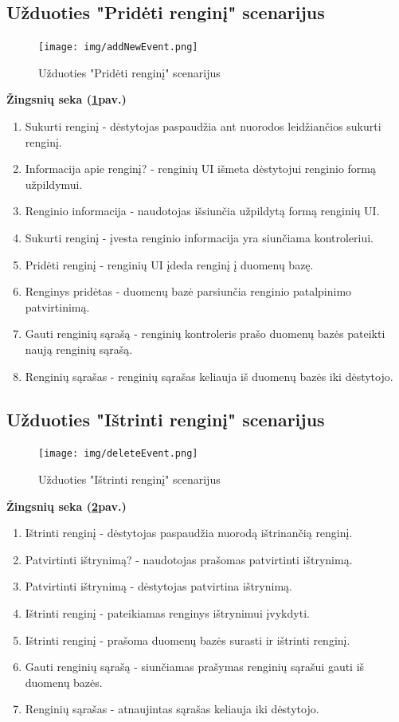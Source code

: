 \documentclass{VUMIFPSkursinis}
\begin{document}
\subsection{Užduoties "Pridėti renginį" scenarijus}
\begin{figure}[H]
	\centering
	\texttt{[image: img/addNewEvent.png]}
	\caption{Užduoties "Pridėti renginį" scenarijus}
	\label{fig:addNewEvent}
\end{figure}
\textbf{Žingsnių seka (\ref{fig:addNewEvent}pav.)}\\
\begin{enumerate}
	\item Sukurti renginį - dėstytojas paspaudžia ant nuorodos leidžiančios sukurti renginį.
	\item Informacija apie renginį? - renginių UI išmeta dėstytojui renginio formą užpildymui.
	\item Renginio informacija - naudotojas išsiunčia užpildytą formą renginių UI.
	\item Sukurti renginį - įvesta renginio informacija yra siunčiama kontroleriui.
	\item Pridėti renginį - renginių UI įdeda renginį į duomenų bazę.
	\item Renginys pridėtas - duomenų bazė parsiunčia renginio patalpinimo patvirtinimą.
	\item Gauti renginių sąrašą - renginių kontroleris prašo duomenų bazės pateikti naują renginių sąrašą.
	\item Renginių sąrašas - renginių sąrašas keliauja iš duomenų bazės iki dėstytojo.
\end{enumerate}
\subsection{Užduoties "Ištrinti renginį" scenarijus}
\begin{figure}[H]
	\centering
	\texttt{[image: img/deleteEvent.png]}
	\caption{Užduoties "Ištrinti renginį" scenarijus}
	\label{fig:delEvent}
\end{figure}
\textbf{Žingsnių seka (\ref{fig:delEvent}pav.)}\\
\begin{enumerate}
	\item Ištrinti renginį - dėstytojas paspaudžia nuorodą ištrinančią renginį.
	\item Patvirtinti ištrynimą? - naudotojas prašomas patvirtinti ištrynimą.
	\item Patvirtinti ištrynimą - dėstytojas patvirtina ištrynimą.
	\item Ištrinti renginį - pateikiamas renginys ištrynimui įvykdyti.
	\item Ištrinti renginį - prašoma duomenų bazės surasti ir ištrinti renginį.
	\item Gauti renginių sąrašą - siunčiamas prašymas renginių sąrašui gauti iš duomenų bazės.
	\item Renginių sąrašas - atnaujintas sąrašas keliauja iki dėstytojo.
\end{enumerate}
\end{document}
